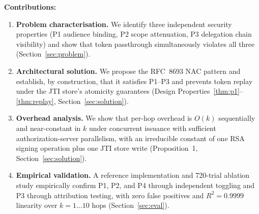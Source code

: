 \documentclass[journal]{IEEEtran}
\theoremstyle{definition}
\begin{document}
\textbf{Contributions:}
\begin{enumerate}
  \item \textbf{Problem characterisation.} We identify three independent
        security properties (P1 audience binding, P2 scope attenuation, P3
        delegation chain visibility) and show that token passthrough simultaneously
        violates all three (Section~\ref{sec:problem}).
  \item \textbf{Architectural solution.} We propose the RFC~8693 NAC
        pattern and establish, by construction, that it satisfies
        P1--P3 and prevents token replay under the JTI store's
        atomicity guarantees
        (Design Properties~\ref{thm:p1}--\ref{thm:replay},
        Section~\ref{sec:solution}).
  \item \textbf{Overhead analysis.} We show that per-hop overhead is
        $O(k)$ sequentially and near-constant in $k$ under concurrent
        issuance with sufficient authorization-server parallelism, with an
        irreducible constant of one RSA signing operation plus one JTI
        store write (Proposition~1, Section~\ref{sec:solution}).
  \item \textbf{Empirical validation.} A reference implementation and 720-trial
        ablation study empirically confirm P1, P2, and P4 through independent
        toggling and P3 through attribution testing, with zero false positives
        and $R^2 = 0.9999$ linearity over $k = 1\ldots10$ hops
        (Section~\ref{sec:eval}).
\end{enumerate}

\end{document}
